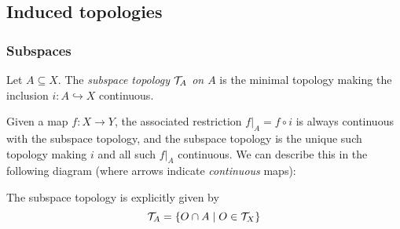 \documentclass[11pt]{article}
\begin{document}







\subsection{Induced topologies}
\subsubsection{Subspaces}
\begin{definition}
    Let $A \subseteq X$. The \emph{subspace topology $\mathcal{T}_A$ on $A$} is the minimal topology making the inclusion $i : A \hookrightarrow X$ continuous.
\end{definition}
Given a map $f : X \to Y$, the associated restriction $f|_A = f \circ i$ is always continuous with the subspace topology, and the subspace topology is the unique such topology making $i$ and all such $f|_A$ continuous. We can describe this in the following diagram (where arrows indicate \emph{continuous} maps):
\begin{center}
\end{center}
The subspace topology is explicitly given by
$$
    \mathcal{T}_A = \left\{  O \cap A \mid O \in \mathcal{T}_X  \right\}
$$
\end{document}
